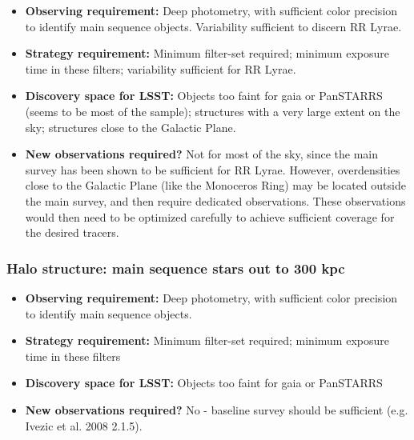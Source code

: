 \begin{itemize}
\item {\bf Observing requirement:} Deep photometry, with sufficient color precision to identify main sequence objects. Variability sufficient to discern RR Lyrae.
\vspace{-2mm}

\item {\bf Strategy requirement:} Minimum filter-set required; minimum exposure time in these filters; variability sufficient for RR Lyrae.
\vspace{-2mm}

\item {\bf Discovery space for LSST:} Objects too faint for gaia or PanSTARRS (seems to be most of the sample); structures with a very large extent on the sky; structures close to the Galactic Plane.
\vspace{-2mm}

\item {\bf New observations required?} Not for most of the sky, since the main survey has been shown to be sufficient for RR Lyrae. However, overdensities close to the Galactic Plane (like the Monoceros Ring) may be located outside the main survey, and then require dedicated observations. These observations would then need to be optimized carefully to achieve sufficient coverage for the desired tracers.
\vspace{-2mm}
\end{itemize}

\subsubsection{Halo structure: main sequence stars out to 300 kpc}

\begin{itemize}
\item {\bf Observing requirement:} Deep photometry, with sufficient color precision to identify main sequence objects.
\vspace{-2mm}

\item {\bf Strategy requirement:} Minimum filter-set required; minimum exposure time in these filters
\vspace{-2mm}

\item {\bf Discovery space for LSST:} Objects too faint for gaia or PanSTARRS
\vspace{-2mm}

\item {\bf New observations required?} No - baseline survey should be sufficient (e.g. Ivezic et al. 2008 2.1.5).
\vspace{-2mm}
\end{itemize}

